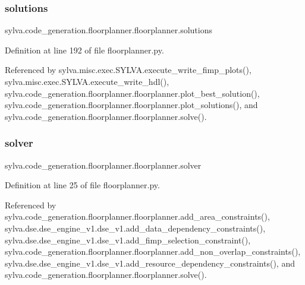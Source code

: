 \mbox{\label{classsylva_1_1code__generation_1_1floorplanner_1_1floorplanner_a4ecec4815a5e0fa5ba3f3ffb9f0697dc}} 
\subsubsection{\texorpdfstring{solutions}{solutions}}
{\footnotesize\ttfamily sylva.\+code\+\_\+generation.\+floorplanner.\+floorplanner.\+solutions}



Definition at line 192 of file floorplanner.\+py.



Referenced by sylva.\+misc.\+exec.\+S\+Y\+L\+V\+A.\+execute\+\_\+write\+\_\+fimp\+\_\+plots(), sylva.\+misc.\+exec.\+S\+Y\+L\+V\+A.\+execute\+\_\+write\+\_\+hdl(), sylva.\+code\+\_\+generation.\+floorplanner.\+floorplanner.\+plot\+\_\+best\+\_\+solution(), sylva.\+code\+\_\+generation.\+floorplanner.\+floorplanner.\+plot\+\_\+solutions(), and sylva.\+code\+\_\+generation.\+floorplanner.\+floorplanner.\+solve().

\mbox{\label{classsylva_1_1code__generation_1_1floorplanner_1_1floorplanner_af588b87074ee8449326528ea765f7bfb}} 
\subsubsection{\texorpdfstring{solver}{solver}}
{\footnotesize\ttfamily sylva.\+code\+\_\+generation.\+floorplanner.\+floorplanner.\+solver}



Definition at line 25 of file floorplanner.\+py.



Referenced by sylva.\+code\+\_\+generation.\+floorplanner.\+floorplanner.\+add\+\_\+area\+\_\+constraints(), sylva.\+dse.\+dse\+\_\+engine\+\_\+v1.\+dse\+\_\+v1.\+add\+\_\+data\+\_\+dependency\+\_\+constraints(), sylva.\+dse.\+dse\+\_\+engine\+\_\+v1.\+dse\+\_\+v1.\+add\+\_\+fimp\+\_\+selection\+\_\+constraint(), sylva.\+code\+\_\+generation.\+floorplanner.\+floorplanner.\+add\+\_\+non\+\_\+overlap\+\_\+constraints(), sylva.\+dse.\+dse\+\_\+engine\+\_\+v1.\+dse\+\_\+v1.\+add\+\_\+resource\+\_\+dependency\+\_\+constraints(), and sylva.\+code\+\_\+generation.\+floorplanner.\+floorplanner.\+solve().

